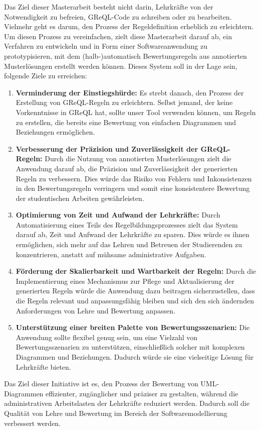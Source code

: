 Das Ziel dieser Masterarbeit besteht nicht darin, Lehrkräfte von der Notwendigkeit zu befreien, GReQL-Code zu schreiben oder zu bearbeiten. Vielmehr geht es darum, den Prozess der Regeldefinition erheblich zu erleichtern. Um diesen Prozess zu vereinfachen, zielt diese Masterarbeit darauf ab, ein Verfahren zu entwickeln und in Form einer Softwareanwendung zu prototypisieren, mit dem (halb-)automatisch Bewertungsregeln aus annotierten Musterlösungen erstellt werden können. Dieses System soll in der Lage sein, folgende Ziele zu erreichen:

\begin{enumerate}
    \item \textbf{Verminderung der Einstiegshürde:} Es strebt danach, den Prozess der Erstellung von GReQL-Regeln zu erleichtern. Selbst jemand, der keine Vorkenntnisse in GReQL hat, sollte unser Tool verwenden können, um Regeln zu erstellen, die bereits eine Bewertung von einfachen Diagrammen und Beziehungen ermöglichen.
    
    \item \textbf{Verbesserung der Präzision und Zuverlässigkeit der GReQL-Regeln:}
    Durch die Nutzung von annotierten Musterlösungen zielt die Anwendung darauf ab, die Präzision und Zuverlässigkeit der generierten Regeln zu verbessern. Dies würde das Risiko von Fehlern und Inkonsistenzen in den Bewertungsregeln verringern und somit eine konsistentere Bewertung der studentischen Arbeiten gewährleisten.
    
    \item \textbf{Optimierung von Zeit und Aufwand der Lehrkräfte:}
    Durch Automatisierung eines Teils des Regelbildungsprozesses zielt das System darauf ab, Zeit und Aufwand der Lehrkräfte zu sparen. Dies würde es ihnen ermöglichen, sich mehr auf das Lehren und Betreuen der Studierenden zu konzentrieren, anstatt auf mühsame administrative Aufgaben.
    
    \item \textbf{Förderung der Skalierbarkeit und Wartbarkeit der Regeln:}
    Durch die Implementierung eines Mechanismus zur Pflege und Aktualisierung der generierten Regeln würde die Anwendung dazu beitragen sicherzustellen, dass die Regeln relevant und anpassungsfähig bleiben und sich den sich ändernden Anforderungen von Lehre und Bewertung anpassen.
    
    \item \textbf{Unterstützung einer breiten Palette von Bewertungsszenarien:}
    Die Anwendung sollte flexibel genug sein, um eine Vielzahl von Bewertungsszenarien zu unterstützen, einschließlich solcher mit komplexen Diagrammen und Beziehungen. Dadurch würde sie eine vielseitige Lösung für Lehrkräfte bieten.
    
\end{enumerate}

Das Ziel dieser Initiative ist es, den Prozess der Bewertung von UML-Diagrammen effizienter, zugänglicher und präziser zu gestalten, während die administrativen Arbeitslasten der Lehrkräfte reduziert werden. Dadurch soll die Qualität von Lehre und Bewertung im Bereich der Softwaremodellierung verbessert werden.
